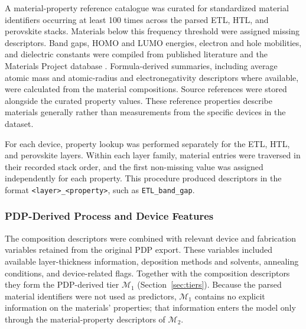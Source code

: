 \documentclass[3p]{elsarticle}
\begin{document}
A material-property reference catalogue was curated for standardized material identifiers occurring at least 100 times across the parsed ETL, HTL, and perovskite stacks. Materials below this frequency threshold were assigned missing descriptors. Band gaps, HOMO and LUMO energies, electron and hole mobilities, and dielectric constants were compiled from published literature \cite{
Cordero2021,
MenendezProupin2022,
Reza2024,
Wang2021Printing,
Zhou2012,
Stoumpos2013,
Konda2023,
Shi2015,
Ryu2014,
Saidaminov2015,
Govinda2017,
Milot2016,
Quan2016,
CorreaBaena2015,
Saliba2016,
Bu2017,
Eperon2014,
Lee2015,
Oga2014,
Bretschneider2018,
Jiang2018SnO2,
Li2022SnO2,
Zhao2016AZO,
Tong2017CdS,
AlAshouri2019,
Wang2023SAM,
Babaei2019,
Jaffe2010CuSCN,
Zhao2015CuSCN,
Ye2015CuSCN,
Arora2017CuSCN,
Wang2017PMMA,
Salomao2015GO,
Najafi2018GO,
Fernandes2016Nb2O5,
P3CT2017,
Jeng2014NiO} and the Materials Project database \cite{jain2013materialsproject}. Formula-derived summaries, including average atomic mass and atomic-radius and electronegativity descriptors where available, were calculated from the material compositions. Source references were stored alongside the curated property values. These reference properties describe materials generally rather than measurements from the specific devices in the dataset.

For each device, property lookup was performed separately for the ETL, HTL, and perovskite layers. Within each layer family, material entries were traversed in their recorded stack order, and the first non-missing value was assigned independently for each property. This procedure produced descriptors in the format \texttt{<layer>\_<property>}, such as \texttt{ETL\_band\_gap}.

\subsubsection{PDP-Derived Process and Device Features}
\label{sec:pdpfeat}

The composition descriptors were combined with relevant device and fabrication variables retained from the original PDP export. These variables included available layer-thickness information, deposition methods and solvents, annealing conditions, and device-related flags. Together with the composition descriptors they form the PDP-derived tier $\mathcal{M}_1$ (Section~\ref{sec:tiers}). Because the parsed material identifiers were not used as predictors, $\mathcal{M}_1$ contains no explicit information on the materials' properties; that information enters the model only through the material-property descriptors of $\mathcal{M}_2$.
\end{document}
